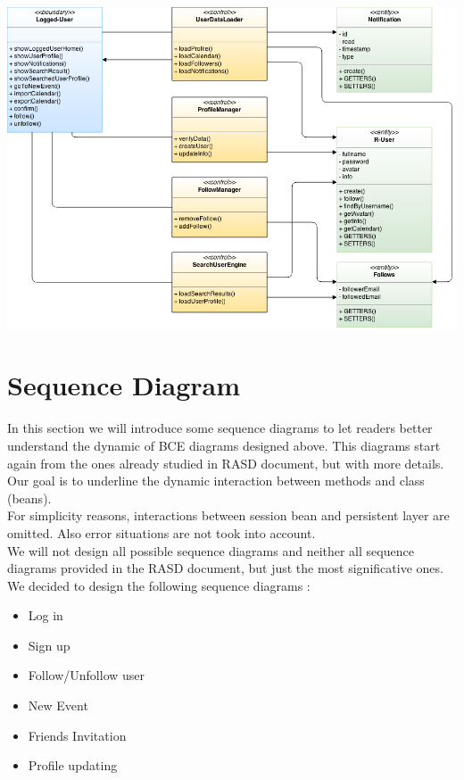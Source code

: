 \documentclass[12pt]{book}
\begin{document}
\vspace{2cm}
\includegraphics[scale=0.45]{user_social_BCE}\\

\chapter{Sequence Diagram}

In this section we will introduce some sequence diagrams to let readers better understand the dynamic of BCE diagrams designed above. This diagrams start again from the ones already studied in RASD document, but with more details. \\
Our goal is to underline the dynamic interaction between methods and class (beans). \\
For simplicity reasons, interactions between session bean and persistent layer are omitted. Also error situations are not took into account. \\

We will not design all possible sequence diagrams and neither all sequence diagrams provided in the RASD document, but just the most significative ones. 
We decided to design the following sequence diagrams : 
\begin{itemize}
\item{Log in}
\item{Sign up}
\item{Follow/Unfollow user}
\item{New Event}
\item{Friends Invitation}
\item{Profile updating}
\end{itemize}
\newpage
\end{document}
